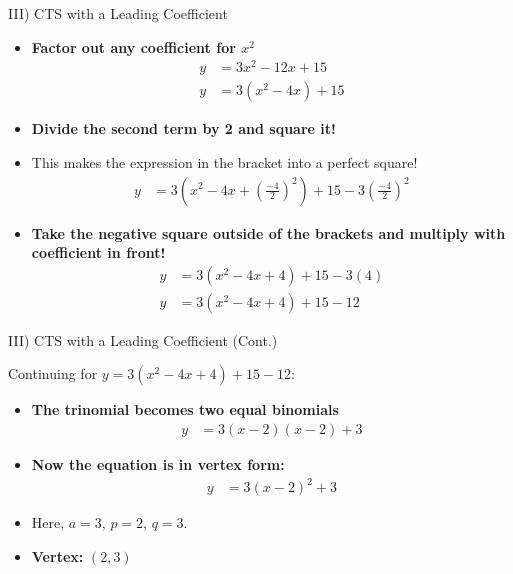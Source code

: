 \documentclass[aspectratio=169]{beamer}
\begin{document}
\begin{frame}{III) CTS with a Leading Coefficient}
    \begin{tcolorbox}[colback=lightgray,colframe=primary,title=Key Steps]
        \footnotesize
        \begin{itemize}
            \item \textbf{Factor out any coefficient for $x^2$}
                \begin{align*}
                    y &= 3x^2 - 12x + 15 \\
                    y &= 3(x^2 - 4x) + 15
                \end{align*}
            \item \textbf{Divide the second term by 2 and square it!}
                \item This makes the expression in the bracket into a perfect square!
                \begin{align*}
                    y &= 3\left(x^2 - 4x + \left(\frac{-4}{2}\right)^2\right) + 15 - 3\left(\frac{-4}{2}\right)^2
                \end{align*}
            \item \textbf{Take the negative square outside of the brackets and multiply with coefficient in front!}
                \begin{align*}
                    y &= 3\left(x^2 - 4x + 4\right) + 15 - 3(4) \\
                    y &= 3(x^2 - 4x + 4) + 15 - 12
                \end{align*}
        \end{itemize}
    \end{tcolorbox}
\end{frame}

\begin{frame}{III) CTS with a Leading Coefficient (Cont.)}
    \begin{tcolorbox}[colback=lightgray,colframe=primary,title=Key Steps (Cont.)]
        \footnotesize
        Continuing for $y = 3(x^2 - 4x + 4) + 15 - 12$:
        \begin{itemize}
            \item \textbf{The trinomial becomes two equal binomials}
                \begin{align*}
                    y &= 3(x-2)(x-2) + 3
                \end{align*}
            \item \textbf{Now the equation is in vertex form:}
                \begin{align*}
                    y &= 3(x-2)^2 + 3
                \end{align*}
            \item Here, $a=3$, $p=2$, $q=3$.
            \item \textbf{Vertex:} $(2, 3)$
        \end{itemize}
    \end{tcolorbox}
\end{frame}
\end{document}
